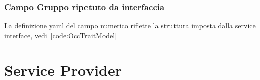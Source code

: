 \documentclass[a4paper,10pt]{report}
\begin{document}
\subsection{Campo Gruppo ripetuto da interfaccia}
La definizione yaml del campo numerico riflette la struttura imposta dalla
service interface, vedi~\ref{code:OccTraitModel}

\chapter{Service Provider}

%
\printindex
\end{document}
